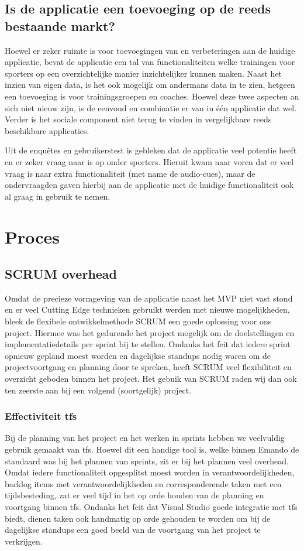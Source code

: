 \subsection{Is de applicatie een toevoeging op de reeds bestaande markt?}
Hoewel er zeker ruimte is voor toevoegingen van en verbeteringen aan de huidige applicatie, bevat de applicatie een tal van functionaliteiten welke trainingen voor sporters op een overzichtelijke manier inzichtelijker kunnen maken. Naast het inzien van eigen data, is het ook mogelijk om andermans data in te zien, hetgeen een toevoeging is voor trainingsgroepen en coaches. 
Hoewel deze twee aspecten an sich niet nieuw zijn, is de eenvoud en combinatie er van in één applicatie dat wel. Verder is het sociale component niet terug te vinden in vergelijkbare reeds beschikbare applicaties.

Uit de enquêtes en gebruikerstest is gebleken dat de applicatie veel potentie heeft en er zeker vraag naar is op onder sporters. Hieruit kwam naar voren dat er veel vraag is naar extra functionaliteit (met name de audio-cues), maar de ondervraagden gaven hierbij aan de applicatie met de huidige functionaliteit ook al graag in gebruik te nemen.

\section{Proces}

\subsection{SCRUM overhead}
Omdat de precieze vormgeving van de applicatie naast het MVP niet vast stond en er veel Cutting Edge technieken gebruikt werden met nieuwe mogelijkheden, bleek de flexibele ontwikkelmethode SCRUM een goede oplossing voor ons project. Hiermee was het gedurende het project mogelijk om de doelstellingen en implementatiedetails per sprint bij te stellen. Ondanks het feit dat iedere sprint opnieuw gepland moest worden en dagelijkse standups nodig waren om de projectvoortgang en planning door te spreken, heeft SCRUM veel flexibiliteit en overzicht geboden binnen het project. Het gebuik van SCRUM raden wij dan ook ten zeerste aan bij een volgend (soortgelijk) project.

\subsubsection{Effectiviteit \ac{tfs}}
Bij de planning van het project en het werken in sprints hebben we veelvuldig gebruik gemaakt van \ac{tfs}. Hoewel dit een handige tool is, welke binnen Emando de standaard was bij het plannen van sprints, zit er bij het plannen veel overhead. Omdat iedere functionaliteit opgesplitst moest worden in verantwoordelijkheden, backlog items met verantwoordelijkheden en corresponderende taken met een tijdsbesteding, zat er veel tijd in het op orde houden van de planning en voortgang binnen \ac{tfs}. Ondanks het feit dat Visual Studio goede integratie met \ac{tfs} biedt, dienen taken ook handmatig op orde gehouden te worden om bij de dagelijkse standups een goed beeld van de voortgang van het project te verkrijgen.

